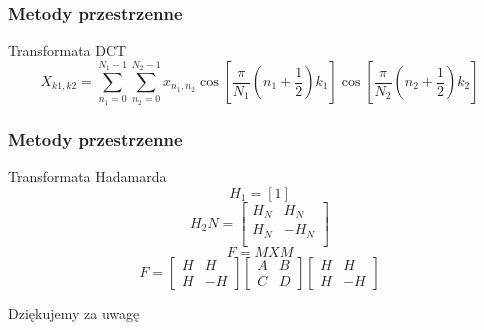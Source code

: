 \documentclass{beamer}
\begin{document}
\begin{frame}
\frametitle{Metody przestrzenne}
\begin{block}{Transformata DCT}
\begin{equation}
X_{k1,k2}=\sum_{n_1=0}^{N_1-1}\sum_{n_2=0}^{N_2-1}x_{n_1,n_2}\cos\left[\frac{\pi}{N_1}\left(n_1+\frac{1}{2}\right)k_1\right]\cos\left[\frac{\pi}{N_2}\left(n_2+\frac{1}{2}\right)k_2\right]
\end{equation}
\end{block}


\end{frame}
\begin{frame}
\frametitle{Metody przestrzenne}
\begin{block}{Transformata Hadamarda}
 \begin{equation}
    H_1=\left[1\right] 
    \end{equation}
    \begin{equation}
           H_2N=\begin{bmatrix}
           H_N&H_N \\
           H_N&-H_N \\
           \end{bmatrix}
    \end{equation}
       \begin{equation}
       F=MXM
       \end{equation}
          \begin{equation}F=
          \begin{bmatrix}
          H& H\\
          H & -H
          \end{bmatrix}
          \begin{bmatrix}
          A& B\\
          C& D
          \end{bmatrix}
             \begin{bmatrix}
             H& H\\
             H & -H
             \end{bmatrix}
          \end{equation}


\end{block}


\end{frame}
\begin{frame}

\begin{center}

\Huge{Dziękujemy za uwagę}
\end{center}
\end{frame}
\end{document}
